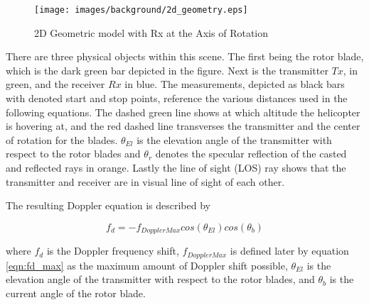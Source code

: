 \begin{figure}[h]
	\begin{center}
		\texttt{[image: images/background/2d\_geometry.eps]}
		\caption{2D Geometric model with Rx at the Axis of Rotation}
		\label{fig:2D_model}
	\end{center}
\end{figure}

There are three physical objects within this scene. The first being the rotor blade, which is the dark green bar depicted in the figure. Next is the transmitter $Tx$, in green, and the receiver $Rx$ in blue. The measurements, depicted as black bars with denoted start and stop points, reference the various distances used in the following equations. The dashed green line shows at which altitude the helicopter is hovering at, and the red dashed line transverses the transmitter and the center of rotation for the blades. $\theta_{El}$ is the elevation angle of the transmitter with respect to the rotor blades and $\theta_r$ denotes the specular reflection of the casted and reflected rays in orange. Lastly the line of sight (LOS) ray shows that the transmitter and receiver are in visual line of sight of each other.

The resulting Doppler equation is described by

\begin{equation}
	f_d = -f_{DopplerMax}cos(\theta_{El})cos(\theta_{b})
	\label{eq:dop_theory_blade}
\end{equation}

where $f_d$ is the Doppler frequency shift, $f_{DopplerMax}$ is defined later by equation \ref{eqn:fd_max} as the maximum amount of Doppler shift possible, $\theta_{El}$ is the elevation angle of the transmitter with respect to the rotor blades, and $\theta_{b}$ is the current angle of the rotor blade.

